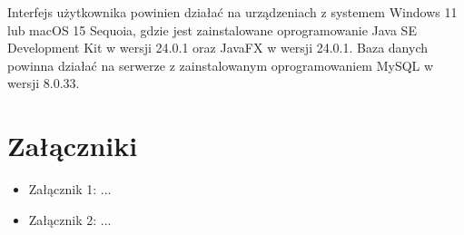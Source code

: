 \documentclass[a4paper,12pt]{article}
\begin{document}
Interfejs użytkownika powinien działać na urządzeniach z systemem Windows 11 lub macOS 15 Sequoia, gdzie jest zainstalowane oprogramowanie Java SE Development Kit w wersji 24.0.1 oraz JavaFX w wersji 24.0.1.
Baza danych powinna działać na serwerze z zainstalowanym oprogramowaniem MySQL w wersji 8.0.33.

\section{Załączniki}

\begin{itemize}
    \item Załącznik 1: ...
    \item Załącznik 2: ...
\end{itemize}
\end{document}
